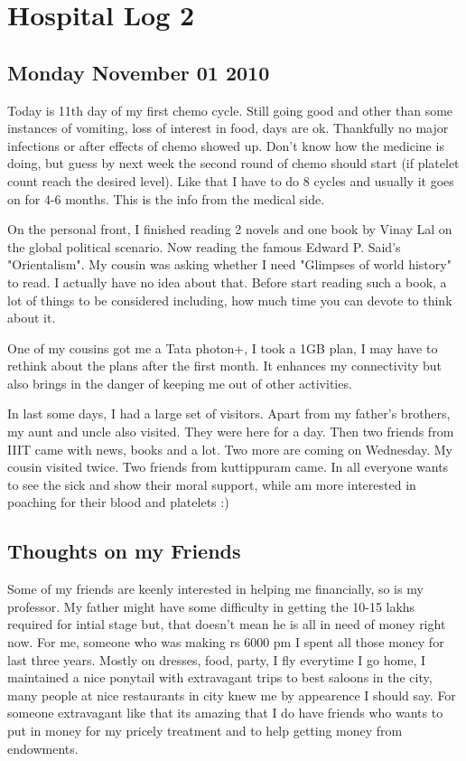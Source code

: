 \section*{Hospital Log 2}
\vskip 2pt

\subsection*{Monday November 01 2010}

Today is 11th day of my first chemo cycle. Still going good and other
than some instances of vomiting, loss of interest in food, days are ok.
Thankfully no major infections or after effects of chemo showed up. 
Don't know how the medicine is doing, but guess by next week the second 
round of chemo should start (if platelet count reach the desired level). 
Like that I have to do 8 cycles and usually it goes on for 4-6 months. 
This is the info from the medical side.

On the personal front, I finished reading 2 novels and one book by Vinay 
Lal on the global political scenario. Now reading the famous Edward P. Said's 
"Orientalism". My cousin was asking whether I need "Glimpses of world history" 
to read. I actually have no idea about that. Before start reading such a book, 
a lot of things to be considered including, how much time you can devote to 
think about it. 

One of my cousins got me a Tata photon+, I took a 1GB plan, I may have to rethink 
about the plans after the first month. It enhances my connectivity but also brings 
in the danger of keeping me out of other activities.

In last some days, I had a large set of visitors. Apart from my father's brothers,
my aunt and uncle also visited. They were here for a day. Then two friends from IIIT 
came with news, books and a lot. Two more are coming on Wednesday. My cousin visited 
twice. Two friends from kuttippuram came. In all everyone wants to see the sick and 
show their moral support, while am more interested in poaching for their blood and 
platelets :) 

\subsection*{Thoughts on my Friends}

Some of my friends are keenly interested in helping me financially, so is my professor. 
My father might have some difficulty in getting the 10-15 lakhs required for intial stage 
but, that doesn't mean he is all in need of money right now. For me, someone who was making 
rs 6000 pm I spent all those money for last three years. Mostly on dresses, food, party, 
I fly everytime I go home, I maintained a nice ponytail with extravagant trips to best 
saloons in the city, many people at nice restaurants in city knew me by appearence I should say. 
For someone extravagant like that its amazing that I do have friends who wants to put in money 
for my pricely treatment and to help getting money from endowments. 

